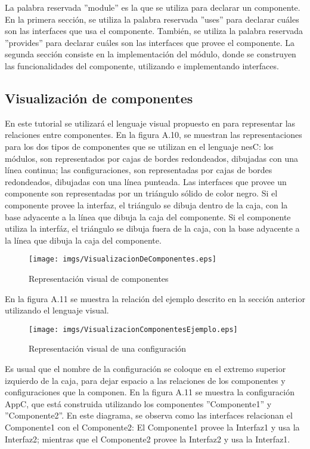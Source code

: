La palabra reservada ''module'' es la que se utiliza para declarar un componente. En la primera sección, se utiliza la palabra reservada ''uses'' para declarar cuáles son las interfaces que usa el componente. También, se utiliza la palabra reservada ''provides'' para declarar cuáles son las interfaces que provee el componente. La segunda sección consiste en la implementación del módulo, donde se construyen las funcionalidades del componente, utilizando e implementando interfaces.

\subsection{Visualización de componentes}
En este tutorial se utilizará el lenguaje visual propuesto en \cite{TinyOSProgramming} para representar las relaciones entre componentes. En la figura A.10, se muestran las representaciones para los dos tipos de componentes que se utilizan en el lenguaje nesC: los módulos, son representados por cajas de bordes redondeados, dibujadas con una línea continua; las configuraciones, son representadas por cajas de bordes redondeados, dibujadas con una línea punteada. Las interfaces que provee un componente son representadas por un triángulo sólido de color negro. Si el componente provee la interfaz, el triángulo se dibuja dentro de la caja, con la base adyacente a la línea que dibuja la caja del componente. Si el componente utiliza la interfáz,  el triángulo se dibuja fuera de la caja, con la base adyacente a la línea que dibuja la caja del componente. 

\begin{figure}[h!]
	\centering
 	\texttt{[image: imgs/VisualizacionDeComponentes.eps]} 
 	\caption{Representación visual de componentes}
\end{figure}

En la figura A.11 se muestra la relación del ejemplo descrito en la sección anterior utilizando el lenguaje visual. 

\begin{figure}[H]
	\centering
 	\texttt{[image: imgs/VisualizacionComponentesEjemplo.eps]} 
 	\caption{Representación visual de una configuración}
\end{figure}

Es usual que el nombre de la configuración se coloque en el extremo superior izquierdo de la caja, para dejar espacio a las relaciones de los componentes y configuraciones que la componen. En la figura A.11 se muestra la configuración AppC, que está construida utilizando los componentes ''Componente1'' y ''Componente2''.  En este diagrama, se observa como las interfaces relacionan el Componente1 con el Componente2: El Componente1 provee la Interfaz1 y usa la Interfaz2; mientras que el Componente2 provee la Interfaz2 y usa la Interfaz1. 

